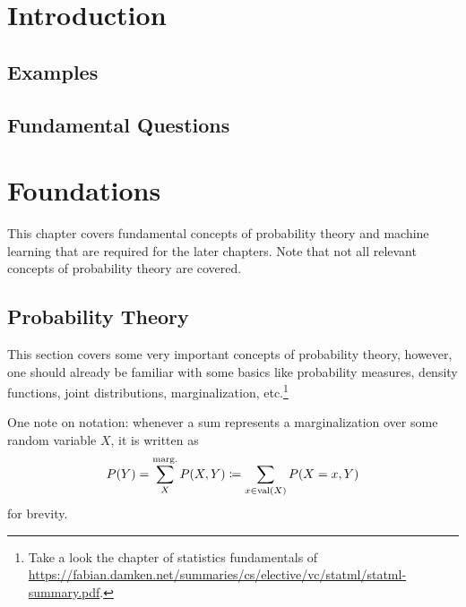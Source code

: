 \chapter{Introduction} %

    \section{Examples} %

    \section{Fundamental Questions} %

\chapter{Foundations}
    This chapter covers fundamental concepts of probability theory and machine learning that are required for the later chapters. Note that not all relevant concepts of probability theory are covered.

    \section{Probability Theory}
	    This section covers some very important concepts of probability theory, however, one should already be familiar with some basics like probability measures, density functions, joint distributions, marginalization, etc.\footnote{Take a look the chapter of statistics fundamentals of \url{https://fabian.damken.net/summaries/cs/elective/vc/statml/statml-summary.pdf}.}

        One note on notation: whenever a sum represents a marginalization over some random variable \(X\), it is written as
        \begin{equation}
        P(Y) = \sum_{X}^{\operatorname{marg.}} P(X, Y) \coloneqq \sum_{x \in \operatorname{val}(X)} P(X = x, Y)
        \end{equation}
        for brevity.

